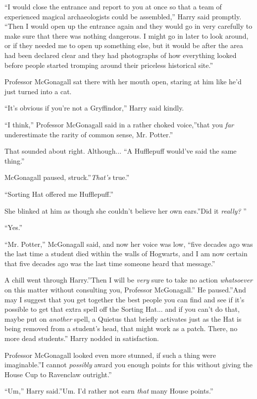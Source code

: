 ``I would close the entrance and report to you at once so that a team of
experienced magical archaeologists could be assembled,'' Harry said
promptly. ``Then I would open up the entrance again and they would go in
very carefully to make sure that there was nothing dangerous. I might go
in later to look around, or if they needed me to open up something else,
but it would be after the area had been declared clear and they had
photographs of how everything looked before people started tromping
around their priceless historical site.''

Professor McGonagall sat there with her mouth open, staring at him like
he'd just turned into a cat.

``It's obvious if you're not a Gryffindor,'' Harry said kindly.

``I think,'' Professor McGonagall said in a rather choked voice,''that
you \emph{far} underestimate the rarity of common sense, Mr. Potter.''

That sounded about right. Although... ``A Hufflepuff would've said
the same thing.''

McGonagall paused, struck.''\emph{That's} true.''

``Sorting Hat offered me Hufflepuff.''

She blinked at him as though she couldn't believe her own ears.''Did it
\emph{really?} ''

``Yes.''

``Mr. Potter,'' McGonagall said, and now her voice was low, ``five
decades ago was the last time a student died within the walls of
Hogwarts, and I am now certain that five decades ago was the last time
someone heard that message.''

A chill went through Harry.''Then I will be \emph{very} sure to take no
action \emph{whatsoever} on this matter without consulting you,
Professor McGonagall.'' He paused.''And may I suggest that you get
together the best people you can find and see if it's possible to get
that extra spell off the Sorting Hat... and if you can't do that,
maybe put on \emph{another} spell, a Quietus that briefly activates just
as the Hat is being removed from a student's head, that might work as a
patch. There, no more dead students.'' Harry nodded in satisfaction.

Professor McGonagall looked even more stunned, if such a thing were
imaginable.''I cannot \emph{possibly} award you enough points for this
without giving the House Cup to Ravenclaw outright.''

``Um,'' Harry said.''Um. I'd rather not earn \emph{that} many House
points.''

